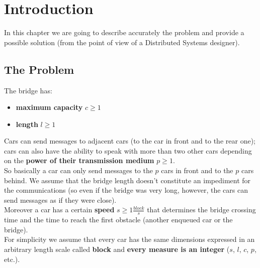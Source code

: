 \chapter{Introduction}\label{ch:intro}

In this chapter we are going to describe accurately the problem and provide a possible 
solution (from the point of view of a Distributed Systems designer).\\


\section{The Problem}

The bridge has:
\begin{itemize} 
    \item \textbf{maximum capacity} $c \geq 1$ 
    \item \textbf{length} $l \geq 1$
\end{itemize}

Cars can send messages to adjacent cars (to the car in front and to the rear one); 
cars can also have the ability to speak with more than two other cars depending on the 
\textbf{power of their transmission medium} $p \geq 1$.\\

So basically a car can only send messages to the $p$ cars in front and 
to the $p$ cars behind. We assume that the bridge length doesn't constitute an impediment 
for the communications (so even if the bridge was very long, however, 
the cars can send messages as if they were close).\\

Moreover a car has a certain \textbf{speed} $s \geq 1 \frac{block}{s}$ that determines 
the bridge crossing time and the time to reach the first obstacle 
(another enqueued car or the bridge).\\ 

For simplicity we assume that every car has the 
same dimensions expressed in an arbitrary length scale called \textbf{block} and 
\textbf{every measure is an integer} ($s$, $l$, $c$, $p$, etc.). \\

